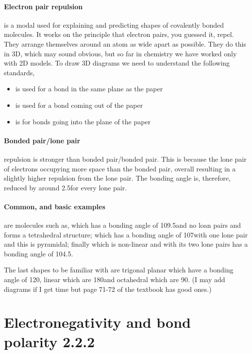 	\paragraph{Electron pair repulsion} is a modal used for explaining and predicting shapes of covalently bonded molecules. It works on the principle that electron pairs, you guessed it, repel. They arrange themselves around an atom as wide apart as possible. They do this in 3D, which may sound obvious, but so far in chemistry we have worked only with 2D models. To draw 3D diagrams we need to understand the following standards,
	\begin{itemize}
		\item {} is used for a bond in the same plane as the paper
		\item {} is used for a bond coming out of the paper
		\item {} is for bonds going into the plane of the paper
	\end{itemize}
	
	\paragraph{Bonded pair/lone pair} repulsion is stronger than bonded pair/bonded pair. This is because the lone pair of electrons occupying more space than the bonded pair, overall resulting in a slightly higher repulsion from the lone pair. The bonding angle is, therefore, reduced by around 2.5\degree for every lone pair.
	
	\paragraph{Common, and basic examples} are molecules such as,  which has a bonding angle of 109.5\degree and no loan pairs and forms a tetrahedral structure;  which has a bonding angle of 107\degree with one lone pair and this is pyramidal; finally  which is non-linear and with its two lone pairs has a bonding angle of 104.5\degree .
	
	The last shapes to be familiar with are trigonal planar which have a bonding angle of 120\degree, linear which are 180\degree and octahedral which are 90\degree . (I may add diagrams if I get time but page 71-72 of the textbook has good ones.)
	
\section{Electronegativity and bond polarity 2.2.2}
